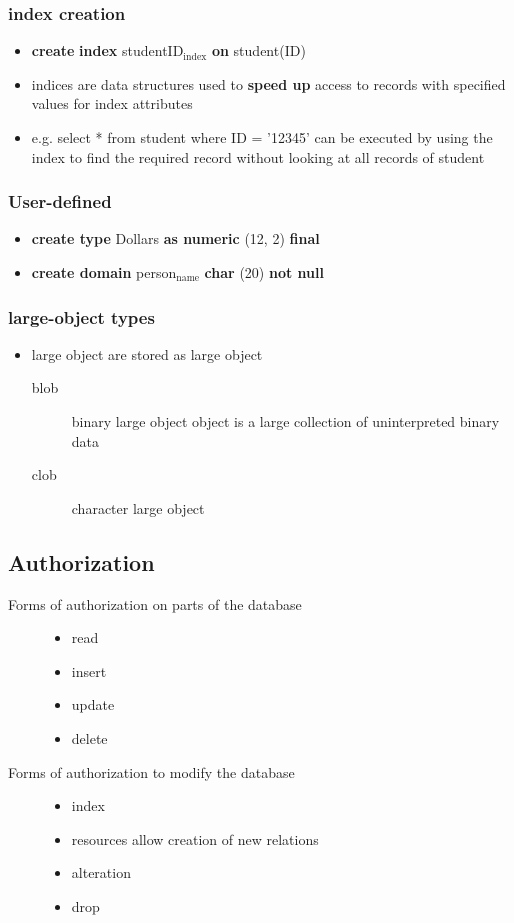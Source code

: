 \documentclass[11pt]{article}
\begin{document}
\subsubsection{index creation}
\label{sec-8-4-2}
\begin{itemize}
\item \textbf{create} \textbf{index} studentID$_{\text{index}}$ \textbf{on} student(ID)
\item indices are data structures used to \textbf{speed up} access to records with
specified values for index attributes
\item e.g. select *
     from student
     where ID = '12345'
can be executed by using the index to find the required record
without looking at all records of student
\end{itemize}
\subsubsection{User-defined}
\label{sec-8-4-3}
\begin{itemize}
\item \textbf{create type} Dollars \textbf{as numeric} (12, 2) \textbf{final}
\item \textbf{create domain} person$_{\text{name}}$ \textbf{char} (20) \textbf{not null}
\end{itemize}
\subsubsection{large-object types}
\label{sec-8-4-4}
\begin{itemize}
\item large object are stored as large object
\begin{description}
\item[{blob}] binary large object
object is a large collection of uninterpreted binary data
\item[{clob}] character large object
\end{description}
\end{itemize}
\subsection{Authorization}
\label{sec-8-5}
\begin{description}
\item[{Forms of authorization on parts of the database}] \begin{itemize}
\item read
\item insert
\item update
\item delete
\end{itemize}
\item[{Forms of authorization to modify the database}] \begin{itemize}
\item index
\item resources
allow creation of new relations
\item alteration
\item drop
\end{itemize}
\end{description}
\end{document}
